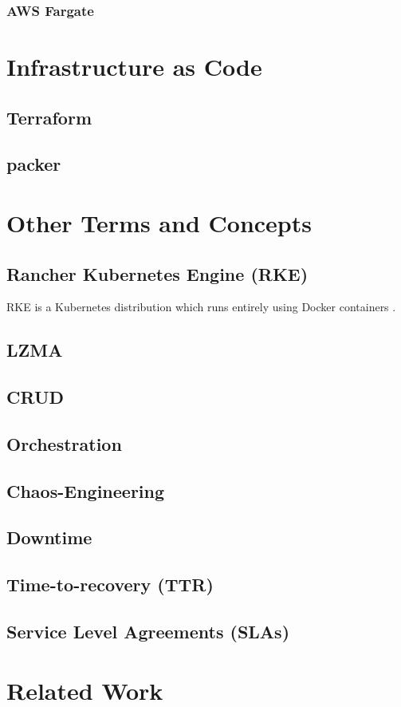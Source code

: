 \subsection{AWS Fargate}

\chapter{Infrastructure as Code}
\section{Terraform}
\section{packer}


\chapter{Other Terms and Concepts}
\section*{Rancher Kubernetes Engine (RKE)}
RKE is a Kubernetes distribution which runs entirely using Docker containers \cite{rke}. 
\section*{LZMA}
\section*{CRUD}
\section*{Orchestration}
\section*{Chaos-Engineering}
\section*{Downtime}
\section*{Time-to-recovery (TTR)}
\section*{Service Level Agreements (SLAs)}

\chapter{Related Work}
